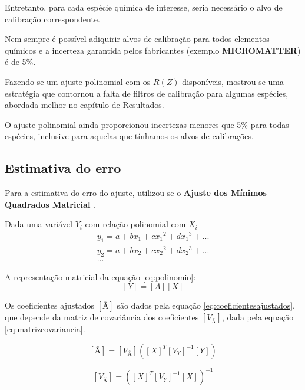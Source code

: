 Entretanto, para cada espécie química de interesse, seria necessário 
o alvo de calibração correspondente.

Nem sempre é possível adiquirir alvos de calibração para todos elementos
químicos e a incerteza garantida pelos fabricantes (exemplo \textbf{MICROMATTER}) é de
5\%. 

Fazendo-se um ajuste polinomial com os $R(Z)$ disponíveis, mostrou-se uma estratégia 
que contornou a falta de filtros de calibração para algumas espécies, abordada melhor
no capítulo de Resultados. 

O ajuste polinomial ainda proporcionou incertezas menores que 5\% para todas espécies, 
inclusive para aquelas que tínhamos os alvos de calibrações.

\subsection{Estimativa do erro}

Para a estimativa do erro do ajuste, utilizou-se o 
\textbf{Ajuste dos Mínimos Quadrados Matricial} \citep{helene2006}.

Dada uma variável $Y_i$ com relação polinomial com $X_i$ 
\begin{equation}
  \label{eq:polinomio}
  \begin{split}
    y_1 = a + b x_1 + c{x_1}^2 + d{x_1}^3 + ...\\
    y_2 = a + b x_2 + c{x_2}^2 + d{x_2}^3 + ... \\
    ...
  \end{split}
\end{equation}

A representação matricial da equação \ref{eq:polinomio}:
\begin{equation}
  \label{eq:polinomioMatriz}
  [Y] = [A][X]
\end{equation}

Os coeficientes ajustados $[Ã]$ são dados pela equação \ref{eq:coeficientesajustados},
que depende da matriz de covariância dos coeficientes $[V_{Ã}]$, 
dada pela equação \ref{eq:matrizcovariancia}.

\begin{equation}
  \label{eq:coeficientesajustados}
  [Ã] = [V_{Ã}] ([X]^T {[V_Y]}^{-1} [Y])
\end{equation}

\begin{equation}
  \label{eq:matrizcovariancia}
  [V_{Ã}] = ([X]^T [V_Y]^{-1} [X])^{-1}
\end{equation}

